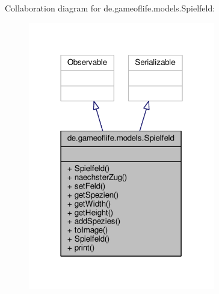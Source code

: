 Collaboration diagram for de.\-gameoflife.\-models.\-Spielfeld\-:\nopagebreak
\begin{figure}[H]
\begin{center}
\leavevmode
\includegraphics[width=231pt]{classde_1_1gameoflife_1_1models_1_1Spielfeld__coll__graph}
\end{center}
\end{figure}
